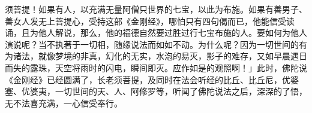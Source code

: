 \documentclass[12pt,twoside,openany]{book}
\newcommand{\kai}[1]{{\CJKfamily{kai}#1}}
\begin{document}
\kai{须菩提！如果有人，以充满无量阿僧只世界的七宝，以此为布施。如果有善男子、善女人发无上菩提心，受持这部《金刚经》，哪怕只有四句偈而已，他能信受读诵，且为他人解说，那么，他的福德自然要过胜过行七宝布施的人。要如何为他人演说呢？当不执著于一切相，随缘说法而如如不动。为什么呢？因为一切世间的有为诸法，就像梦境的非真，幻化的无实，水泡的易灭，影子的难存，又如早晨遇日而失的露珠，天空将雨时的闪电，瞬间即灭。应作如是的观照啊！」此时，佛陀说《金刚经》已经圆满了，长老须菩提，及同时在法会听经的比丘、比丘尼，优婆塞、优婆夷，一切世间的天、人、阿修罗等，听闻了佛陀说法之后，深深的了悟，无不法喜充满，一心信受奉行。}
\end{document}
